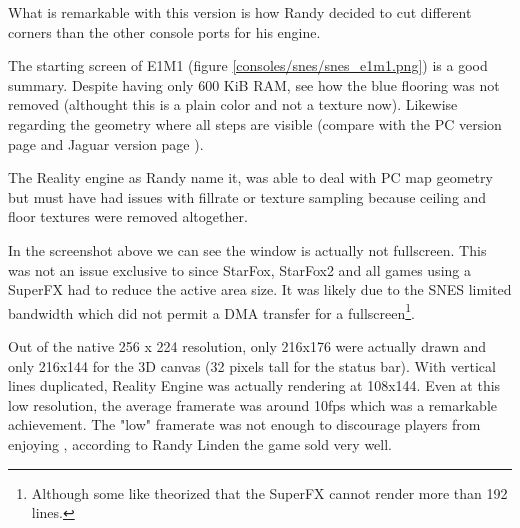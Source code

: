 What is remarkable with this version is how Randy decided to cut different corners than the other console ports for his engine.\\
\par
{}
\par
The starting screen of E1M1 (figure \ref{consoles/snes/snes_e1m1.png}) is a good summary. Despite having only 600 KiB RAM, see how the blue flooring was not removed (althought this is a plain color and not a texture now). Likewise regarding the geometry where all steps are visible (compare with the PC version page \pageref{mashed_potatoes1.png} and Jaguar version page \pageref{doom_jaguar3.png}).\\
\par The Reality engine as Randy name it, was able to deal with PC map geometry but must have had issues with fillrate or texture sampling because ceiling and floor textures were removed altogether.













\par
In the screenshot above we can see the window is actually not fullscreen. This was not an issue exclusive to \doom{} since StarFox, StarFox2 and all games using a SuperFX had to reduce the active area size. It was likely due to the SNES limited bandwidth which did not permit a DMA transfer for a fullscreen\footnote{Although some like  theorized that the SuperFX cannot render more than 192 lines.}.\\
\par
Out of the native 256 x 224 resolution, only 216x176 were actually drawn and only 216x144 for the 3D canvas (32 pixels tall for the status bar). With vertical lines duplicated, Reality Engine was actually rendering at 108x144. Even at this low resolution, the average framerate was around 10fps which was a remarkable achievement. The "low" framerate was not enough to discourage players from enjoying \doom, according to Randy Linden the game sold very well.







